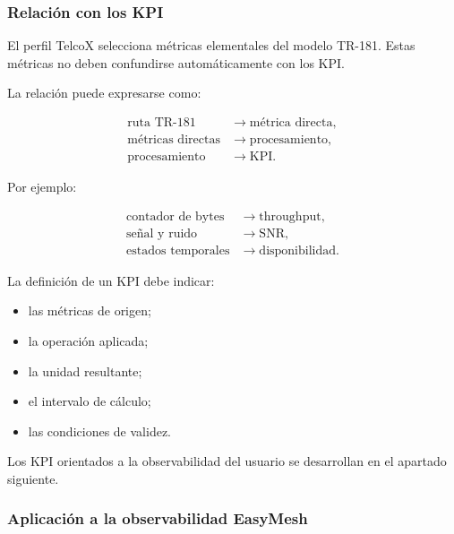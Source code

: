 \subsubsection*{Relación con los KPI}

El perfil TelcoX selecciona métricas elementales del modelo TR-181. Estas
métricas no deben confundirse automáticamente con los KPI.

La relación puede expresarse como:

\[
\begin{aligned}
    \text{ruta TR-181}
    &\longrightarrow
    \text{métrica directa},\\
    \text{métricas directas}
    &\longrightarrow
    \text{procesamiento},\\
    \text{procesamiento}
    &\longrightarrow
    \text{KPI}.
\end{aligned}
\]

Por ejemplo:

\[
\begin{aligned}
    \text{contador de bytes}
    &\longrightarrow
    \text{throughput},\\
    \text{señal y ruido}
    &\longrightarrow
    \text{SNR},\\
    \text{estados temporales}
    &\longrightarrow
    \text{disponibilidad}.
\end{aligned}
\]

La definición de un KPI debe indicar:

\begin{itemize}
    \item las métricas de origen;

    \item la operación aplicada;

    \item la unidad resultante;

    \item el intervalo de cálculo;

    \item las condiciones de validez.
\end{itemize}

Los KPI orientados a la observabilidad del usuario se desarrollan en el
apartado siguiente.


\subsubsection*{Aplicación a la observabilidad EasyMesh}

